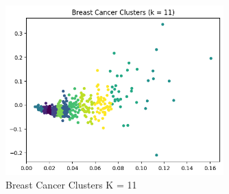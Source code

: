 \documentclass[12pt]{article}
\begin{document}
\begin{enumerate}
\begin{enumerate}
    \begin{figure}[H]
      \centering 
      \includegraphics[width=0.75\textwidth]{2_3_11.png}
      \caption{Breast Cancer Clusters K = 11}
    \end{figure}


  \end{enumerate}


\end{enumerate}

\end{document}
